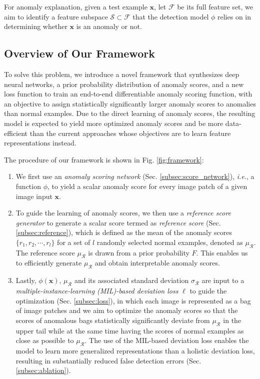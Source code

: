 \documentclass[10pt,journal,compsoc]{IEEEtran}
\begin{document}
For anomaly explanation, given a test example $\mathbf{x}$, let $\mathcal{F}$ be its full feature set, we aim to identify a feature subspace $\mathcal{S} \subset \mathcal{F}$ that the detection model $\phi$ relies on in determining whether $\mathbf{x}$ is an anomaly or not.


\subsection{Overview of Our Framework}

To solve this problem, we introduce a novel framework that synthesizes deep neural networks, a prior probability distribution of anomaly scores, and a new loss function to train an end-to-end differentiable anomaly scoring function, with an objective to assign statistically significantly larger anomaly scores to anomalies than normal examples. Due to the direct learning of anomaly scores, the resulting model is expected to yield more optimized anomaly scores and be more data-efficient than the current approaches whose objectives are to learn feature representations instead. 

The procedure of our framework is shown in Fig. \ref{fig:framework}: 
\begin{enumerate}
    \item We first use an \textit{anomaly scoring network} (Sec. \ref{subsec:score_network}), \textit{i.e.}, a function $\phi$, to yield a scalar anomaly score for every image patch of a given image input $\mathbf{x}$.
    \item To guide the learning of anomaly scores, we then use a \textit{reference score generator} to generate a scalar score termed as \textit{reference score} (Sec. \ref{subsec:reference}), which is defined as the mean of the anomaly scores $\{r_1, r_2, \cdots, r_l\}$ for a set of $l$ randomly selected normal examples, denoted as $\mu_{\mathcal{R}}$. The reference score $\mu_{\mathcal{R}}$ is
drawn from a prior probability $F$. This enables us to efficiently generate $\mu_{\mathcal{R}}$ and obtain interpretable anomaly scores. 
    \item Lastly, $\phi(\mathbf{x})$, $\mu_{\mathcal{R}}$ and its associated standard deviation $\sigma_{\mathcal{R}}$ are input to a  \textit{multiple-instance-learning (MIL)-based deviation loss} $\ell$ to guide the optimization (Sec. \ref{subsec:loss}), in which each image is represented as a bag of image patches and we aim to optimize the anomaly scores so that the scores of anomalous bags statistically significantly deviate from $\mu_{\mathcal{R}}$ in the upper tail while at the same time having the scores of normal examples as close as possible to $\mu_{\mathcal{R}}$. The use of the MIL-based deviation loss enables the model to learn more generalized representations than a holistic deviation loss, resulting in substantially reduced false detection errors (Sec. \ref{subsec:ablation}).
\end{enumerate}
\end{document}
